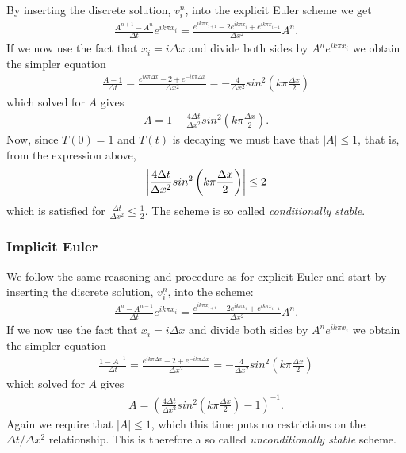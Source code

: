 \documentclass[11pt,a4paper,draft]{article}
\numberwithin{equation}{section}
\begin{document}
By inserting the discrete solution, $v^n_i$, into the explicit Euler scheme we get
\begin{align*}
\frac{A^{n+1}-A^{n}}{\Delta t} e^{ik \pi x_i} = \frac{e^{ik \pi x_{i+1}} -2e^{ik \pi x_i} + e^{ik \pi x_{i-1}}}{\Delta x^2} A^n.
\end{align*}
If we now use the fact that $x_i = i\Delta x$ and divide both sides by $A^n e^{ik \pi x_i}$ we obtain the simpler equation
\begin{align*}
\frac{A-1}{\Delta t} = \frac{e^{ik \pi \Delta x} -2 + e^{-ik \pi \Delta x}}{\Delta x^2} = -\frac{4}{\Delta x^2}sin^2\left(k\pi \frac{\Delta x}{2}\right)
\end{align*}
which solved for $A$ gives
\begin{align*}
A=1-\frac{4\Delta t}{\Delta x^2}sin^2\left(k\pi \frac{\Delta x}{2}\right).
\end{align*}
Now, since $T(0)=1$ and $T(t)$ is decaying we must have that $|A| \leq 1$, that is, from the expression above, 
\begin{align*}
\abs{ \frac{4\Delta t}{\Delta x^2}sin^2\left(k\pi \frac{\Delta x}{2}\right)} \leq 2
\end{align*} 
which is satisfied for $\frac{\Delta t}{\Delta x^2} \leq \frac{1}{2}$. The scheme is so called \emph{conditionally stable}.

\subsubsection{Implicit Euler}
We follow the same reasoning and procedure as for explicit Euler and start by inserting the discrete solution, $v^n_i$, into the scheme:
\begin{align*}
\frac{A^{n}-A^{n-1}}{\Delta t} e^{ik \pi x_i} = \frac{e^{ik \pi x_{i+1}} -2e^{ik \pi x_i} + e^{ik \pi x_{i-1}}}{\Delta x^2} A^n.
\end{align*}
If we now use the fact that $x_i = i\Delta x$ and divide both sides by $A^n e^{ik \pi x_i}$ we obtain the simpler equation
\begin{align*}
\frac{1-A^{-1}}{\Delta t} = \frac{e^{ik \pi \Delta x} -2 + e^{-ik \pi \Delta x}}{\Delta x^2} = -\frac{4}{\Delta x^2}sin^2\left(k\pi \frac{\Delta x}{2}\right)
\end{align*}
which solved for $A$ gives
\begin{align*}
A=\left( \frac{4\Delta t}{\Delta x^2}sin^2\left(k\pi \frac{\Delta x}{2}\right)-1 \right)^{-1}.
\end{align*}
Again we require that $|A| \leq 1$, which this time puts no restrictions on the $\Delta t/ \Delta x^2$ relationship. This is therefore a so called \emph{unconditionally stable} scheme.
\end{document}
